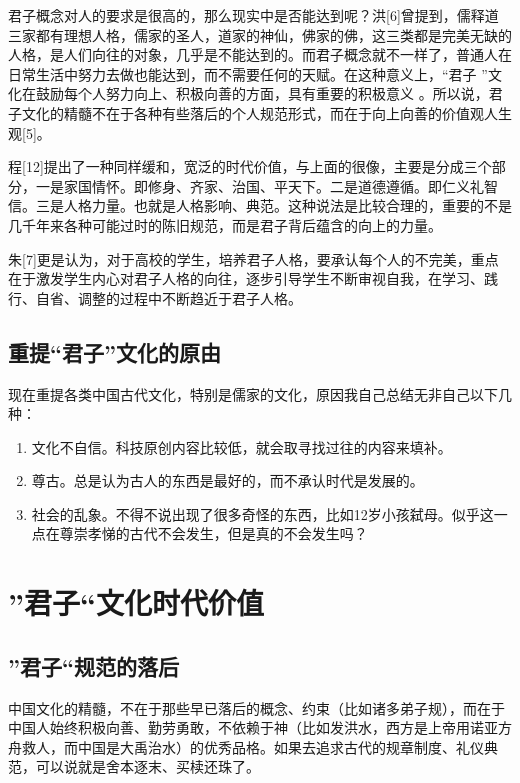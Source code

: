 \documentclass[]{article}
\begin{document}
君子概念对人的要求是很高的，那么现实中是否能达到呢？洪{[}6{]}曾提到，儒释道三家都有理想人格，儒家的圣人，道家的神仙，佛家的佛，这三类都是完美无缺的人格，是人们向往的对象，几乎是不能达到的。而君子概念就不一样了，普通人在日常生活中努力去做也能达到，而不需要任何的天赋。在这种意义上，``君子
''文化在鼓励每个人努力向上、积极向善的方面，具有重要的积极意义
。所以说，君子文化的精髓不在于各种有些落后的个人规范形式，而在于向上向善的价值观人生观{[}5{]}。

程{[}12{]}提出了一种同样缓和，宽泛的时代价值，与上面的很像，主要是分成三个部分，一是家国情怀。即修身、齐家、治国、平天下。二是道德遵循。即仁义礼智信。三是人格力量。也就是人格影响、典范。这种说法是比较合理的，重要的不是几千年来各种可能过时的陈旧规范，而是君子背后蕴含的向上的力量。

朱{[}7{]}更是认为，对于高校的学生，培养君子人格，要承认每个人的不完美，重点在于激发学生内心对君子人格的向往，逐步引导学生不断审视自我，在学习、践行、自省、调整的过程中不断趋近于君子人格。

\hypertarget{header-n103}{%
\subsection{重提``君子''文化的原由}\label{header-n103}}

现在重提各类中国古代文化，特别是儒家的文化，原因我自己总结无非自己以下几种：

\begin{enumerate}
\def\labelenumi{\arabic{enumi}.}
\item
  文化不自信。科技原创内容比较低，就会取寻找过往的内容来填补。
\item
  尊古。总是认为古人的东西是最好的，而不承认时代是发展的。
\item
  社会的乱象。不得不说出现了很多奇怪的东西，比如12岁小孩弑母。似乎这一点在尊崇孝悌的古代不会发生，但是真的不会发生吗？
\end{enumerate}

\hypertarget{header-n116}{%
\section{''君子``文化时代价值}\label{header-n116}}

\hypertarget{header-n117}{%
\subsection{''君子``规范的落后}\label{header-n117}}

中国文化的精髓，不在于那些早已落后的概念、约束（比如诸多弟子规），而在于中国人始终积极向善、勤劳勇敢，不依赖于神（比如发洪水，西方是上帝用诺亚方舟救人，而中国是大禹治水）的优秀品格。如果去追求古代的规章制度、礼仪典范，可以说就是舍本逐末、买椟还珠了。
\end{document}
